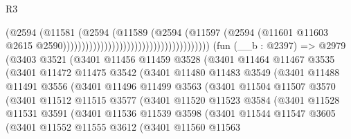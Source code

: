 \begin{lexlean}{R3}
\begin{coremodule}
                                                                  (@2594
                                                                    (@11581
                                                                      (@2594
                                                                        (@11589
                                                                          (@2594
                                                                            (@11597
                                                                              (@2594
                                                                                (@11601
                                                                                  @11603
                                                                                  @2615
                                                                                  @2590)))))))))))))))))))))))))))))))))))))))
    (fun (__b : @2397) =>
    @2979
      (@3403
        @3521
        (@3401
          @11456
          @11459
          @3528
          (@3401
            @11464
            @11467
            @3535
            (@3401
              @11472
              @11475
              @3542
              (@3401
                @11480
                @11483
                @3549
                (@3401
                  @11488
                  @11491
                  @3556
                  (@3401
                    @11496
                    @11499
                    @3563
                    (@3401
                      @11504
                      @11507
                      @3570
                      (@3401
                        @11512
                        @11515
                        @3577
                        (@3401
                          @11520
                          @11523
                          @3584
                          (@3401
                            @11528
                            @11531
                            @3591
                            (@3401
                              @11536
                              @11539
                              @3598
                              (@3401
                                @11544
                                @11547
                                @3605
                                (@3401
                                  @11552
                                  @11555
                                  @3612
                                  (@3401
                                    @11560
                                    @11563

\end{coremodule}
\end{lexlean}
